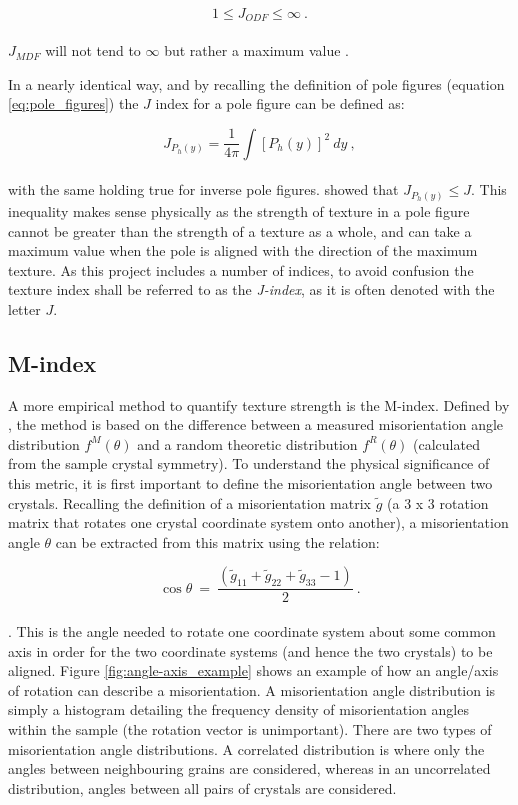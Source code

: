 \documentclass[a4paper,12pt,twoside]{report}
\numberwithin{equation}{chapter}
\begin{document}
\begin{equation}
1 \leq J_{ODF} \leq \infty\ .
\end{equation}
\\
$J_{MDF}$ will not tend to $\infty$ but rather a maximum value \citep{Mainprice}.

In a nearly identical way, and by recalling the definition of pole figures (equation \ref{eq:pole_figures}) the $J$ index for a pole figure can be defined as:
 
\begin{equation}
J_{P_h(y)} = \frac{1}{4\pi} \int [ P_{h}(y) ]^2\ dy\ ,
\end{equation}
\\
with the same holding true for inverse pole figures. \cite{bunge1982texture} showed that $J_{P_h(y)} \leq J$. This inequality makes sense physically as the strength of texture in a pole figure cannot be greater than the strength of a texture as a whole, and can take a maximum value when the pole is aligned with the direction of the maximum texture. As this project includes a number of indices, to avoid confusion the texture index shall be referred to as the \emph{J-index}, as it is often denoted with the letter $J$.


\subsection{M-index} \label{subsec:Mindex}
A more empirical method to quantify texture strength is the M-index. Defined by \cite{Skemer}, the method is based on the difference between a measured misorientation angle distribution $f^M(\theta)$ and a random theoretic distribution $f^R(\theta)$ (calculated from the sample crystal symmetry). To understand the physical significance of this metric, it is first important to define the misorientation angle between two crystals. Recalling the definition of a misorientation matrix $\tilde{g}$ (a 3 x 3 rotation matrix that rotates one crystal coordinate system onto another), a misorientation angle $\theta$ can be extracted from this matrix using the relation:

\begin{equation} \label{eq:misorientation_angle}
\cos{\theta}\ =\ \frac{(\tilde{g}_{11} + \tilde{g}_{22} + \tilde{g}_{33} - 1)}{2}\ .
\end{equation} 
\\
\citep{Randle2000}. This is the angle needed to rotate one coordinate system about some common axis in order for the two coordinate systems (and hence the two crystals) to be aligned. Figure \ref{fig:angle-axis_example} shows an example of how an angle/axis of rotation can describe a misorientation. A misorientation angle distribution is simply a histogram detailing the frequency density of misorientation angles within the sample (the rotation vector is unimportant). There are two types of misorientation angle distributions. A correlated distribution is where only the angles between neighbouring grains are considered, whereas in an uncorrelated distribution, angles between all pairs of crystals are considered.
\end{document}
